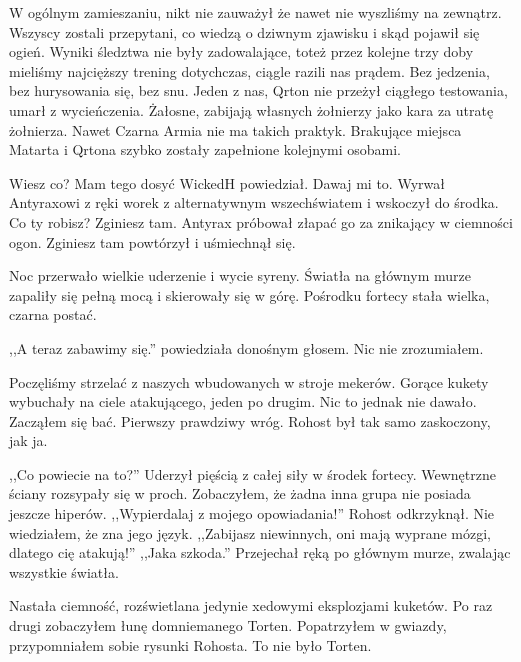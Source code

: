 W ogólnym zamieszaniu, nikt nie zauważył że nawet nie wyszliśmy na zewnątrz.
Wszyscy zostali przepytani, co wiedzą o dziwnym zjawisku i skąd pojawił się ogień.
Wyniki śledztwa nie były zadowalające, toteż przez kolejne trzy doby mieliśmy najcięższy trening dotychczas, ciągle razili nas prądem.
Bez jedzenia, bez hurysowania się, bez snu. Jeden z nas, Qrton nie przeżył ciągłego testowania, umarł z wycieńczenia. Żałosne, zabijają własnych żołnierzy jako kara za utratę żołnierza.
Nawet Czarna Armia nie ma takich praktyk.
Brakujące miejsca Matarta i Qrtona szybko zostały zapełnione kolejnymi osobami.

\divider{}

\begin{dialogue}
\ds{} Wiesz co? Mam tego dosyć \dm{} WickedH powiedział. \dm{} Dawaj mi to. \dm{} Wyrwał Antyraxowi z ręki worek z alternatywnym wszechświatem i wskoczył do środka.
\ds{} Co ty robisz? Zginiesz tam. \dm{} Antyrax próbował złapać go za znikający w ciemności ogon. \dm{} Zginiesz tam \dm{} powtórzył i uśmiechnął się.
\end{dialogue}

\divider{}

Noc przerwało wielkie uderzenie i wycie syreny.
Światła na głównym murze zapaliły się pełną mocą i skierowały się w górę.
Pośrodku fortecy stała wielka, czarna postać.

\begin{dialogue}
\ds{} ,,A teraz zabawimy się.'' \dm{} powiedziała donośnym głosem. Nic nie zrozumiałem.
\end{dialogue}

Poczęliśmy strzelać z naszych wbudowanych w stroje mekerów.
Gorące kukety wybuchały na ciele atakującego, jeden po drugim. Nic to jednak nie dawało.
Zacząłem się bać. Pierwszy prawdziwy wróg. Rohost był tak samo zaskoczony, jak ja.

\begin{dialogue}
\ds{} ,,Co powiecie na to?'' \dm{} Uderzył pięścią z całej siły w środek fortecy. Wewnętrzne ściany rozsypały się w proch. Zobaczyłem, że żadna inna grupa nie posiada jeszcze hiperów.
\ds{} ,,Wypierdalaj z mojego opowiadania!'' \dm{} Rohost odkrzyknął. Nie wiedziałem, że zna jego język. \dm{} ,,Zabijasz niewinnych, oni mają wyprane mózgi, dlatego cię atakują!''
\ds{} ,,Jaka szkoda.'' \dm{} Przejechał ręką po głównym murze, zwalając wszystkie światła. 
\end{dialogue}
Nastała ciemność, rozświetlana jedynie xedowymi eksplozjami kuketów.
Po raz drugi zobaczyłem łunę domniemanego Torten.
Popatrzyłem w gwiazdy, przypomniałem sobie rysunki Rohosta.
To nie było Torten.

